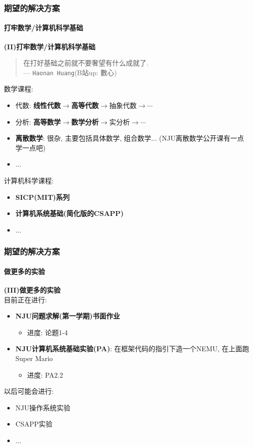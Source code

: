 \documentclass[11pt]{beamer}
\begin{document}
	\begin{frame}
		\frametitle{期望的解决方案}
		\framesubtitle{打牢数学/计算机科学基础}
		\textbf{(II)打牢数学/计算机科学基础}
		
		\begin{quote}
			在打好基础之前就不要奢望有什么成就了. \\--- \texttt{Haonan Huang}(B站up: 數心)
		\end{quote}
		
		
		数学课程:
		\begin{itemize}
			\item 代数: \textbf{线性代数}$\rightarrow$\textbf{高等代数}$\rightarrow$抽象代数$\rightarrow \cdots$
			\item 分析: \textbf{高等数学}$\rightarrow$\textbf{数学分析}$\rightarrow$实分析$\rightarrow\cdots$
			\item \textbf{离散数学}: 很杂, 主要包括具体数学, 组合数学... (NJU离散数学公开课有一点学一点吧)
			\item ...
		\end{itemize} 
		计算机科学课程:
		\begin{itemize}
			\item \textbf{SICP(MIT)系列}
			\item \textbf{计算机系统基础(简化版的CSAPP)}
			\item ...
		\end{itemize} 
	\end{frame}

	\begin{frame}
		\frametitle{期望的解决方案}
		\framesubtitle{做更多的实验}
		\textbf{(III)做更多的实验}\\
		目前正在进行: 
		\begin{itemize}
			\item \textbf{NJU问题求解(第一学期)书面作业}
			\begin{itemize}
				\item 进度: 论题1-4
			\end{itemize}
			\item \textbf{NJU计算机系统基础实验(PA)}: 在框架代码的指引下造一个NEMU, 在上面跑Super Mario 
			\begin{itemize}
				\item 进度: PA2.2
			\end{itemize}
		\end{itemize} 
	以后可能会进行:
	
	\begin{itemize}
		\item NJU操作系统实验
		\item CSAPP实验
		\item ...
	\end{itemize} 
	\end{frame}
\end{document}
